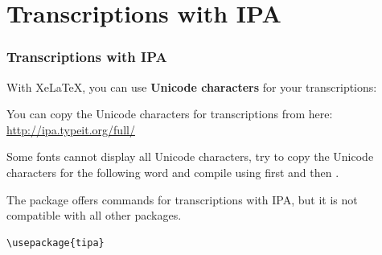 \section{Transcriptions with IPA}

\begin{frame}[fragile]
\frametitle{Transcriptions with IPA}

With Xe\LaTeX , you can use \textbf{Unicode characters} for your transcriptions:

\smallskip

You can copy the Unicode characters for transcriptions from here:\\
\url{http://ipa.typeit.org/full/}

\smallskip

Some fonts cannot display all Unicode characters, \fe try to copy the Unicode characters for the following word and compile using first  and then .

\ea \textipa{["PE\t{ts}@nd@\textscr{}5]}
\z 

\pause 

\bigskip

The package \textbf{} offers commands for transcriptions with IPA, but it is not compatible with all other packages. %

\begin{lstlisting}
\usepackage{tipa}
\end{lstlisting}


%

\end{frame}


